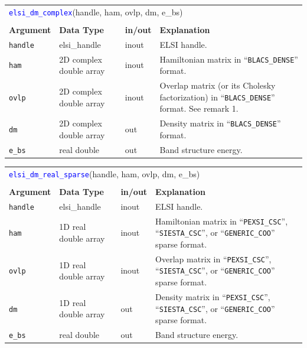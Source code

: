 \documentclass{report}
\newcommand{\api}[1]{\textcolor{blue}{\texttt{#1}}}
\begin{document}
\begin{tabular}[]{|p{20mm}|p{40mm}|p{10mm}|p{92mm}|}
\multicolumn{4}{l}{\api{elsi\_dm\_complex}(handle, ham, ovlp, dm, e\_bs)}\\
\multicolumn{4}{l}{}\\
\hline
\multicolumn{1}{|l|}{\textbf{Argument}} & \multicolumn{1}{l|}{\textbf{Data Type}} & \multicolumn{1}{l|}{\textbf{in/out}} & \multicolumn{1}{l|}{\textbf{Explanation}}\\
\hline
\texttt{handle} & elsi\_handle            & inout & ELSI handle.\\
\hline
\texttt{ham}    & 2D complex double array & inout & Hamiltonian matrix in ``\texttt{BLACS\_DENSE}'' format.\\
\hline
\texttt{ovlp}   & 2D complex double array & inout & Overlap matrix (or its Cholesky factorization) in ``\texttt{BLACS\_DENSE}'' format. See remark 1.\\
\hline
\texttt{dm}     & 2D complex double array & out   & Density matrix in ``\texttt{BLACS\_DENSE}'' format.\\
\hline
\texttt{e\_bs}  & real double             & out   & Band structure energy.\\
\hline
\end{tabular}

\begin{tabular}[]{|p{20mm}|p{40mm}|p{10mm}|p{92mm}|}
\multicolumn{4}{l}{\api{elsi\_dm\_real\_sparse}(handle, ham, ovlp, dm, e\_bs)}\\
\multicolumn{4}{l}{}\\
\hline
\multicolumn{1}{|l|}{\textbf{Argument}} & \multicolumn{1}{l|}{\textbf{Data Type}} & \multicolumn{1}{l|}{\textbf{in/out}} & \multicolumn{1}{l|}{\textbf{Explanation}}\\
\hline
\texttt{handle} & elsi\_handle         & inout & ELSI handle.\\
\hline
\texttt{ham}    & 1D real double array & inout & Hamiltonian matrix in ``\texttt{PEXSI\_CSC}'', ``\texttt{SIESTA\_CSC}'', or ``\texttt{GENERIC\_COO}'' sparse format.\\
\hline
\texttt{ovlp}   & 1D real double array & inout & Overlap matrix in ``\texttt{PEXSI\_CSC}'', ``\texttt{SIESTA\_CSC}'', or ``\texttt{GENERIC\_COO}'' sparse format.\\
\hline
\texttt{dm}     & 1D real double array & out   & Density matrix in ``\texttt{PEXSI\_CSC}'', ``\texttt{SIESTA\_CSC}'', or ``\texttt{GENERIC\_COO}'' sparse format.\\
\hline
\texttt{e\_bs}  & real double          & out   & Band structure energy.\\
\hline
\end{tabular}
\end{document}
